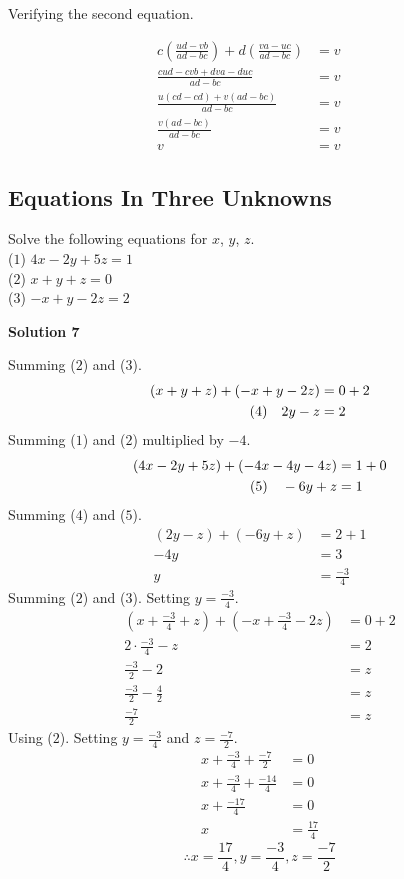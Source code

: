 Verifying the second equation.

\begin{align*}
    c\left(\frac{ud - vb}{ad - bc}\right) + d\left(\frac{va - uc}{ad - bc}\right) &= v && \\
    \frac{cud - cvb + dva - duc}{ad - bc} &= v && \\
    \frac{u(cd - cd) + v(ad - bc)}{ad - bc} &= v && \\
    \frac{v(ad - bc)}{ad - bc} &= v && \\
    v &= v
\end{align*}

\subsection{Equations In Three Unknowns}

\begin{tcolorbox}[title=Problem 7, breakable]
    Solve the following equations for $x$, $y$, $z$. \\
    ($1$) $4x - 2y + 5z = 1$ \\
    ($2$) $x + y + z = 0$ \\
    ($3$) $-x + y -2z = 2$
\end{tcolorbox}

\textbf{Solution 7}

Summing ($2$) and ($3$).
\begin{align*}
    (x + y + z) + (-x + y -2z) &= 0 + 2 \\
    \hspace{-2cm}\text{(4)}\quad 2y - z &= 2
\end{align*}
Summing ($1$) and ($2$) multiplied by $-4$.
\begin{align*}
    (4x - 2y + 5z) + (-4x - 4y - 4z) &= 1 + 0 \\
    \hspace{-2cm}\text{(5)}\quad -6y + z &= 1
\end{align*}
Summing ($4$) and ($5$).
\begin{align*}
    (2y - z) + (-6y + z) &= 2 + 1 \\
    -4y &= 3 \\
    y &= \frac{-3}{4}
\end{align*}
Summing ($2$) and ($3$). Setting $y = \frac{-3}{4}$.
\begin{align*}
    (x + \frac{-3}{4} + z) + (-x + \frac{-3}{4} -2z) &= 0 + 2 \\
    2 \cdot \frac{-3}{4} - z &= 2 \\
    \frac{-3}{2} - 2 &= z \\
    \frac{-3}{2} - \frac{4}{2} &= z \\
    \frac{-7}{2} &= z 
\end{align*}
Using ($2$). Setting $y = \frac{-3}{4}$ and $z = \frac{-7}{2}$.
\begin{align*}
    x + \frac{-3}{4} + \frac{-7}{2} &= 0 \\
    x + \frac{-3}{4} + \frac{-14}{4} &= 0 \\
    x + \frac{-17}{4} &= 0 \\
    x &=  \frac{17}{4}
\end{align*}
\[\therefore x =  \frac{17}{4}, y = \frac{-3}{4}, z = \frac{-7}{2} \]

